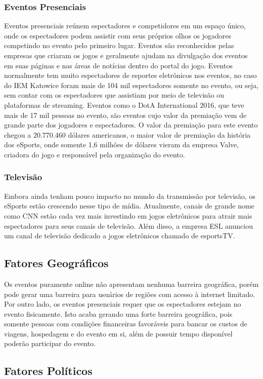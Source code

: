 \documentclass[a4paper, 12pt]{paper}
\begin{document}
\subsubsection{Eventos Presenciais}
Eventos presenciais reúnem espectadores e competidores em um espaço único, onde os espectadores podem assistir com seus próprios olhos os jogadores competindo no evento pelo primeiro lugar. Eventos são reconhecidos pelas empresas que criaram os jogos e geralmente ajudam na divulgação dos eventos em suas páginas e nas áreas de notícias dentro do portal do jogo. Eventos normalmente tem muito espectadores de esportes eletrônicos nos eventos, no caso do IEM Katowice foram mais de 104 mil espectadores somente no evento, ou seja, sem contar com os espectadores que assistiam por meio de televisão ou plataformas de streaming. Eventos como o DotA International 2016, que teve mais de 17 mil pessoas no evento, são eventos cujo valor da premiação vem de grande parte dos jogadores e espectadores. O valor da premiação para este evento chegou a 20.770.460 dólares americanos, o maior valor de premiação da história dos eSports, onde somente 1,6 milhões de dólares vieram da empresa Valve, criadora do jogo e responsável pela organização do evento.
\subsubsection{Televisão}
Embora ainda tenham pouco impacto no mundo da transmissão por televisão, os eSports estão crescendo nesse tipo de mídia. Atualmente, canais de grande nome como CNN estão cada vez mais investindo em jogos eletrônicos para atrair mais espectadores para seus canais de televisão. Além disso, a empresa ESL anunciou um canal de televisão dedicado a jogos eletrônicos chamado de esportsTV.
\subsection{Fatores Geográficos}
Os eventos puramente online não apresentam nenhuma barreira geográfica, porém pode gerar uma barreira para usuários de regiões com acesso à internet limitado. Por outro lado, os eventos presenciais requer que os espectadores estejam no evento fisicamente. Isto acaba gerando uma forte barreira geográfica, pois somente pessoas com condições financeiras favoráveis para bancar os custos de viagens, hospedagem e do evento em si, além de possuir tempo disponível poderão participar do evento.
\subsection{Fatores Políticos}
\end{document}
